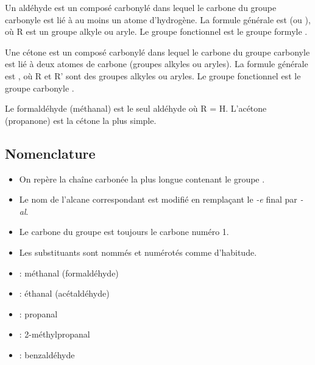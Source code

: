 \begin{definition}[Aldéhyde]
Un aldéhyde est un composé carbonylé dans lequel le carbone du groupe carbonyle est lié à au moins un atome d'hydrogène. La formule générale est  (ou ), où R est un groupe alkyle ou aryle. Le groupe fonctionnel est le groupe formyle .
\end{definition}

\begin{definition}[Cétone]
Une cétone est un composé carbonylé dans lequel le carbone du groupe carbonyle est lié à deux atomes de carbone (groupes alkyles ou aryles). La formule générale est , où R et R' sont des groupes alkyles ou aryles. Le groupe fonctionnel est le groupe carbonyle .
\end{definition}

\begin{remarque}
Le formaldéhyde (méthanal)  est le seul aldéhyde où R = H. L'acétone (propanone)  est la cétone la plus simple.
\end{remarque}

\subsection{Nomenclature}

\begin{loi}
\begin{itemize}
    \item On repère la chaîne carbonée la plus longue contenant le groupe .
    \item Le nom de l'alcane correspondant est modifié en remplaçant le \textit{-e} final par \textit{-al}.
    \item Le carbone du groupe  est toujours le carbone numéro 1.
    \item Les substituants sont nommés et numérotés comme d'habitude.
\end{itemize}
\end{loi}

\begin{exemple}
\begin{itemize}
    \item {} : méthanal (formaldéhyde)
    \item {} : éthanal (acétaldéhyde)
    \item {} : propanal
    \item {} : 2-méthylpropanal
    \item {} : benzaldéhyde
\end{itemize}
\end{exemple}

